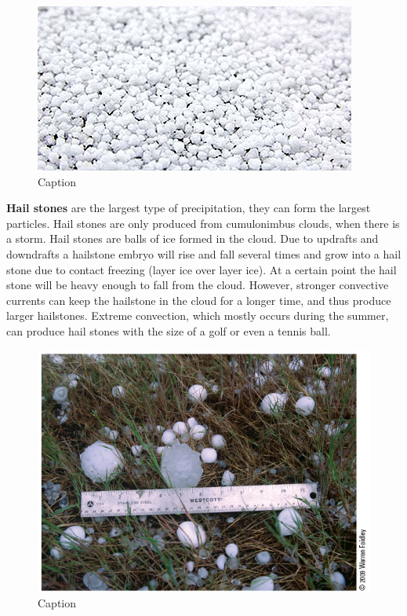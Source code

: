 \documentclass[12pt,oneside]{book}
\begin{document}
\begin{figure}

{\centering \includegraphics[width=0.9\linewidth]{figures/Figure346} 

}

\caption{Caption}\label{fig:Pellets3}
\end{figure}

\textbf{Hail stones} are the largest type of precipitation, they can
form the largest particles. Hail stones are only produced from
cumulonimbus clouds, when there is a storm. Hail stones are balls of ice
formed in the cloud. Due to updrafts and downdrafts a hailstone embryo
will rise and fall several times and grow into a hail stone due to
contact freezing (layer ice over layer ice). At a certain point the hail
stone will be heavy enough to fall from the cloud. However, stronger
convective currents can keep the hailstone in the cloud for a longer
time, and thus produce larger hailstones. Extreme convection, which
mostly occurs during the summer, can produce hail stones with the size
of a golf or even a tennis ball.

\begin{figure}

{\centering \includegraphics[width=0.9\linewidth]{figures/Figure347} 

}

\caption{Caption}\label{fig:Hail}
\end{figure}
\end{document}
